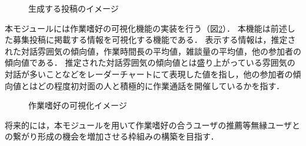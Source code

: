 \begin{figure}
    \centering
    \caption{生成する投稿のイメージ}
    \label{fig:tweet_image}
\end{figure}

本モジュールには作業嗜好の可視化機能の実装を行う（図\ref{fig:estimationgraph}）．
本機能は前述した募集投稿に掲載する情報を可視化する機能である．
表示する情報は，推定された対話雰囲気の傾向値，作業時間長の平均値，雑談量の平均値，他の参加者の傾向値である．
推定された対話雰囲気の傾向値とは盛り上がっている雰囲気の対話が多いことなどをレーダーチャートにて表現した値を指し，他の参加者の傾向値とはどの程度初対面の人と積極的に作業通話を開催しているかを指す．

\begin{figure}
    \centering
    \caption{作業嗜好の可視化イメージ}
    \label{fig:estimationgraph}
\end{figure}

将来的には，本モジュールを用いて作業嗜好の合うユーザの推薦等無縁ユーザとの繋がり形成の機会を増加させる枠組みの構築を目指す．
